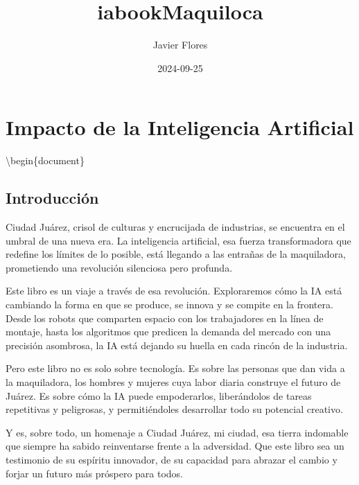 \documentclass[
  10pt,
  letterpaper,
]{book}
\title{iabookMaquiloca}
\author{Javier Flores}
\date{2024-09-25}
\renewcommand*\contentsname{Table of contents}
\newcommand\contentsname{Table of contents}
\begin{document}
\frontmatter
\maketitle

\renewcommand*\contentsname{Table of contents}
{
\hypersetup{linkcolor=}
\setcounter{tocdepth}{2}
\tableofcontents
}
\mainmatter
{}

\chapter*{Impacto de la Inteligencia
Artificial}\label{impacto-de-la-inteligencia-artificial}


\textbackslash begin\{document\}

\section*{Introducción}\label{introducciuxf3n}


Ciudad Juárez, crisol de culturas y encrucijada de industrias, se
encuentra en el umbral de una nueva era. La inteligencia artificial, esa
fuerza transformadora que redefine los límites de lo posible, está
llegando a las entrañas de la maquiladora, prometiendo una revolución
silenciosa pero profunda.

Este libro es un viaje a través de esa revolución. Exploraremos cómo la
IA está cambiando la forma en que se produce, se innova y se compite en
la frontera. Desde los robots que comparten espacio con los trabajadores
en la línea de montaje, hasta los algoritmos que predicen la demanda del
mercado con una precisión asombrosa, la IA está dejando su huella en
cada rincón de la industria.

Pero este libro no es solo sobre tecnología. Es sobre las personas que
dan vida a la maquiladora, los hombres y mujeres cuya labor diaria
construye el futuro de Juárez. Es sobre cómo la IA puede empoderarlos,
liberándolos de tareas repetitivas y peligrosas, y permitiéndoles
desarrollar todo su potencial creativo.

Y es, sobre todo, un homenaje a Ciudad Juárez, mi ciudad, esa tierra
indomable que siempre ha sabido reinventarse frente a la adversidad. Que
este libro sea un testimonio de su espíritu innovador, de su capacidad
para abrazar el cambio y forjar un futuro más próspero para todos.
\end{document}
